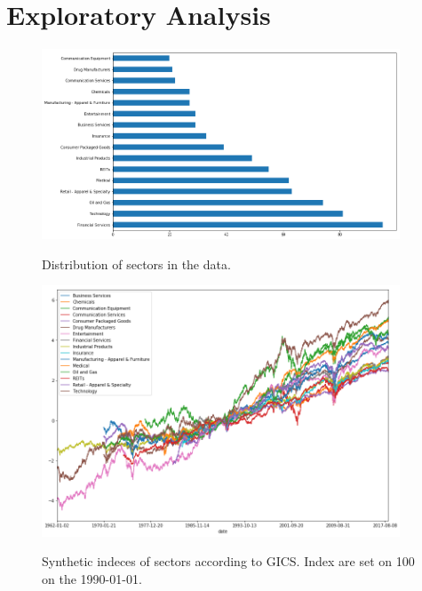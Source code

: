 \documentclass[a4paper,twoside]{article}
\begin{document}
\section{Exploratory Analysis}
\label{sec:orgbb7eeb8}

\begin{figure}    
\begin{center}
  \label{fig:keras-nn}
  \includegraphics[width=0.95\textwidth]{figures/sectors_distribution}
  \caption{Distribution of sectors in the data.}
  \end{center}
\end{figure}

\begin{figure}    
\begin{center}
  \label{fig:keras-nn}
  \includegraphics[width=0.95\textwidth]{figures/indexes_level}
  \caption{Synthetic indeces of sectors according to GICS. Index are set on 100 on the 1990-01-01.}
  \end{center}
\end{figure}
\end{document}
